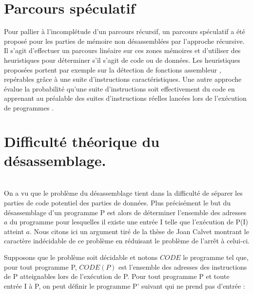 \section{Parcours spéculatif}
Pour pallier à l'incomplétude d'un parcours récursif, un parcours spéculatif a été proposé pour les parties de mémoire non désassemblées par l'approche récursive. 
Il s'agit d'effectuer un parcours linéaire sur ces zones mémoires et d'utiliser des heuristiques pour déterminer s'il s'agit de code ou de données.
Les heuristiques proposées portent par exemple sur la détection de fonctions assembleur \cite{KruegelRVV04}, repérables grâce à une suite d'instructions caractéristiques. Une autre approche évalue la probabilité qu'une suite d'instructions soit effectivement du code en apprenant au préalable des suites d'instructions réelles lancées lors de l'exécution de programmes \cite{KDF09}.



\section{Difficulté théorique du désassemblage.}
~\\
On a vu que le problème du désassemblage tient dans la difficulté de séparer les parties de code potentiel des parties de données.
Plus précisément le but du désassemblage d'un programme P est alors de déterminer l'ensemble des adresses $a$ du programme pour lesquelles il existe une entrée I telle que l'exécution de P(I) atteint $a$.
Nous citons ici un argument tiré de la thèse de Joan Calvet \cite{Calvet2013} montrant le caractère indécidable de ce problème en réduisant le problème de l'arrêt à celui-ci.

Supposons que le problème soit décidable et notons $CODE$ le programme tel que, pour tout programme P, $CODE(P)$ est l'ensemble des adresses des instructions de P atteignables lors de l'exécution de P. Pour tout programme P et toute entrée I à P, on peut définir le programme P' suivant qui ne prend pas d'entrée :

